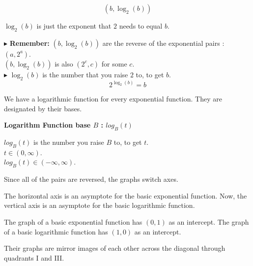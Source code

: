 \documentclass{ximera}
\begin{document}
\[
(b, \log_2(b))
\]




$\log_2(b)$ is just the exponent that $2$ needs to equal $b$.





$\blacktriangleright$ \textbf{Remember:} $(b, \log_2(b))$ are the reverse of the exponential pairs : $(a, 2^a)$.  \\

$(b, \log_2(b))$ is also $(2^c, c)$ for some $c$. \\


$\blacktriangleright$  $\log_2(b)$ is the number that you raise $2$ to, to get $b$.  \\

\[   2^{\log_2(b)} = b     \]

We have a logarithmic function for every exponential function.  They are designated by their bases.
















\begin{definition} \textbf{\textcolor{green!50!black}{Logarithm Function base $B$ : $log_B(t)$}}


$log_B(t)$ is the number you raise $B$ to, to get $t$. \\

$t \in (0, \infty)$. \\

$log_B(t) \in (-\infty, \infty)$.


\end{definition}






Since all of the pairs are reversed, the graphs switch axes.



The horizontal axis is an asymptote for the basic exponential function. Now, the vertical axis is an asymptote for the basic logarithmic function.


The graph of a basic exponential function has $(0,1)$ as an intercept.  The graph of a basic logarithmic function has $(1,0)$ as an intercept. 


Their graphs are mirror images of each other across the diagonal through quadrants I and III.
\end{document}
